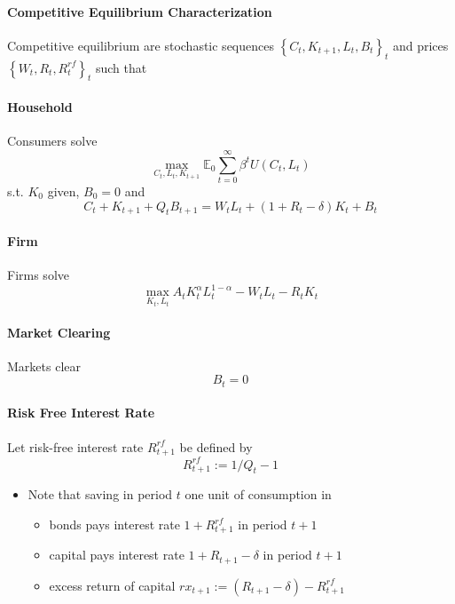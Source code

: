 \documentclass[10pt]{article}
\begin{document}
\paragraph{Competitive Equilibrium Characterization}

Competitive equilibrium are stochastic sequences $\left\{C_t, K_{t+1}, L_t, B_t\right\}_t$ and prices $\left\{W_t, R_t, R_t^{r f}\right\}_t$ such that

\paragraph{Household}

Consumers solve
$$
\max _{C_t, L_t, K_{t+1}} \mathbb{E}_0 \sum_{t=0}^{\infty} \beta^t U\left(C_t, L_t\right)
$$
s.t. $K_0$ given, $B_0=0$ and
$$
C_t+K_{t+1}+Q_t B_{t+1}=W_t L_t+\left(1+R_t-\delta\right) K_t+B_t
$$


\paragraph{Firm}

Firms solve
$$
\max _{K_t, L_t} A_t K_t^\alpha L_t^{1-\alpha}-W_t L_t-R_t K_t
$$

\paragraph{Market Clearing}

Markets clear
$$
B_t=0
$$


\paragraph{Risk Free Interest Rate}

Let risk-free interest rate $R_{t+1}^{r f}$ be defined by
$$
R_{t+1}^{r f}:=1 / Q_t-1
$$

\begin{itemize}
    \item Note that saving in period $t$ one unit of consumption in
        \begin{itemize}
            \item bonds pays interest rate $1+R_{t+1}^{r f}$ in period $t+1$
            \item capital pays interest rate $1+R_{t+1}-\delta$ in period $t+1$
            \item excess return of capital $r x_{t+1}:=\left(R_{t+1}-\delta\right)-R_{t+1}^{r f}$
        \end{itemize}
\end{itemize}
\end{document}
